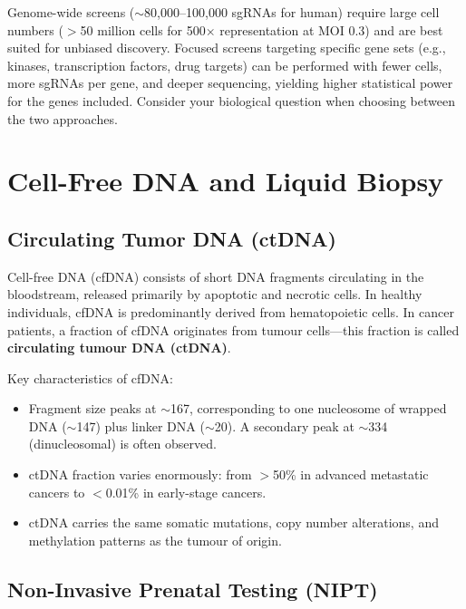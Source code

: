 \begin{tipbox}[title={Genome-wide vs.\ Focused Screens}]
Genome-wide screens ($\sim$80,000--100,000 sgRNAs for human) require large cell numbers ($>$50 million cells for 500$\times$ representation at MOI 0.3) and are best suited for unbiased discovery. Focused screens targeting specific gene sets (e.g., kinases, transcription factors, drug targets) can be performed with fewer cells, more sgRNAs per gene, and deeper sequencing, yielding higher statistical power for the genes included. Consider your biological question when choosing between the two approaches.
\end{tipbox}


\section{Cell-Free DNA and Liquid Biopsy}
\label{sec:specialized:cfdna}

\subsection{Circulating Tumor DNA (ctDNA)}
\label{subsec:specialized:ctdna}

Cell-free DNA (cfDNA) consists of short DNA fragments circulating in the bloodstream, released primarily by apoptotic and necrotic cells. In healthy individuals, cfDNA is predominantly derived from hematopoietic cells. In cancer patients, a fraction of cfDNA originates from tumour cells---this fraction is called \textbf{circulating tumour DNA (ctDNA)}.

Key characteristics of cfDNA:
\begin{itemize}[itemsep=2pt]
  \item Fragment size peaks at $\sim$167\basepair{}, corresponding to one nucleosome of wrapped DNA ($\sim$147\basepair{}) plus linker DNA ($\sim$20\basepair{}). A secondary peak at $\sim$334\basepair{} (dinucleosomal) is often observed.
  \item ctDNA fraction varies enormously: from $>$50\% in advanced metastatic cancers to $<$0.01\% in early-stage cancers.
  \item ctDNA carries the same somatic mutations, copy number alterations, and methylation patterns as the tumour of origin.
\end{itemize}

\subsection{Non-Invasive Prenatal Testing (NIPT)}
\label{subsec:specialized:nipt}

